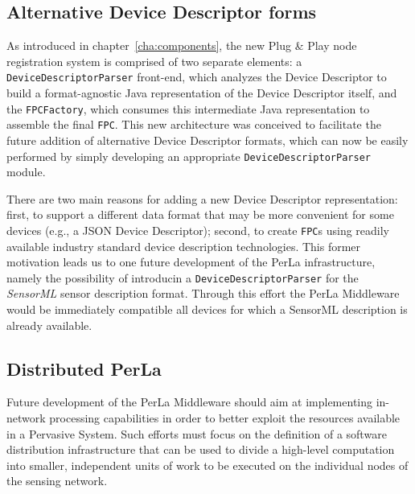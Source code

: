 \subsection{Alternative Device Descriptor forms}

As introduced in chapter~\ref{cha:components}, the new Plug \& Play node
registration system is comprised of two separate elements: a
\texttt{DeviceDescriptorParser} front-end, which analyzes the Device Descriptor
to build a format-agnostic Java representation of the Device Descriptor itself,
and the \texttt{FPCFactory}, which consumes this intermediate Java
representation to assemble the final \texttt{FPC}. This new architecture was
conceived to facilitate the future addition of alternative Device Descriptor
formats, which can now be easily performed by simply developing an appropriate
\texttt{DeviceDescriptorParser} module.

There are two main reasons for adding a new Device Descriptor representation:
first, to support a different data format that may be more convenient for some
devices (e.g., a JSON Device Descriptor); second, to create \texttt{FPC}s using
readily available industry standard device description technologies. This
former motivation leads us to one future development of the PerLa
infrastructure, namely the possibility of introducin a
\texttt{DeviceDescriptorParser} for the \textit{SensorML} \cite{sensorml}
sensor description format. Through this effort the PerLa Middleware would be
immediately compatible all devices for which a SensorML description is already
available.

\subsection{Distributed PerLa}

Future development of the PerLa Middleware should aim at implementing
in-network processing capabilities in order to better exploit the resources
available in a Pervasive System. Such efforts must focus on the definition of a
software distribution infrastructure that can be used to divide a high-level
computation into smaller, independent units of work to be executed on the
individual nodes of the sensing network.
